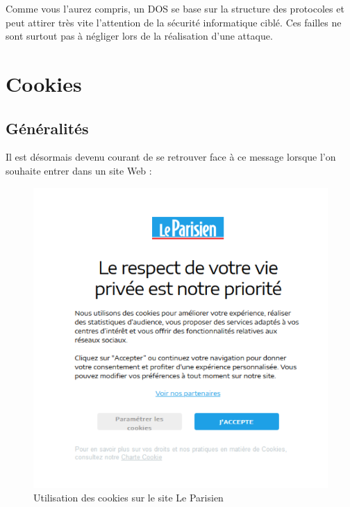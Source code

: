 Comme vous l'aurez compris, un DOS se base sur la structure des protocoles et peut attirer très vite l'attention de la sécurité informatique ciblé. Ces failles ne sont surtout pas à négliger lors de la réalisation d'une attaque.

\newpage

\section{Cookies}

\subsection{Généralités}

Il est désormais devenu courant de se retrouver face à ce message lorsque l’on souhaite entrer dans un site Web :

\begin{figure}[htp!]
  \centering
  \setlength\figureheight{7cm}
  \setlength\figurewidth{9cm}
  \includegraphics[width=1\textwidth]{oui/Ancien/imangeancien/cookie/cookie1.PNG}
   \caption{Utilisation des cookies sur le site Le Parisien}
  \label{fig:courbe-tikz}
\end{figure}


